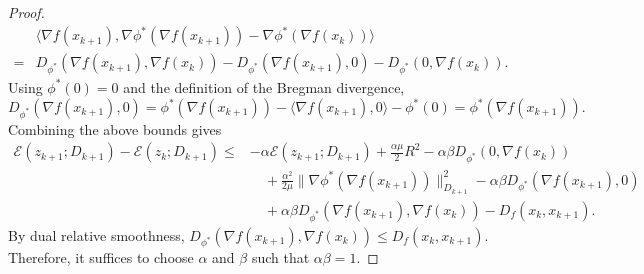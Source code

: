 \documentclass{article}
\theoremstyle{plain}
\newtheorem{lemma}{Lemma}
\theoremstyle{remark}
\begin{document}
\begin{proof}
$$\begin{aligned}
&\langle \nabla f(x_{k+1}), \nabla \phi^*(\nabla f(x_{k+1})) - \nabla \phi^*(\nabla f(x_{k}))\rangle
\\
={}& D_{\phi^*}(\nabla f(x_{k+1}),\nabla f(x_{k})) - D_{\phi^*}(\nabla f(x_{k+1}),0) - D_{\phi^*}(0,\nabla f(x_{k})).
\end{aligned}
$$
Using $\phi^*(0)=0$ and the definition of the Bregman divergence,
$$
D_{\phi^*}(\nabla f(x_{k+1}),0)=\phi^*(\nabla f(x_{k+1}))-\langle \nabla f(x_{k+1}),0\rangle-\phi^*(0)=\phi^*(\nabla f(x_{k+1})).
$$
Combining the above bounds gives
$$
\begin{aligned}
\mathcal{E}(z_{k+1};D_{k+1}) - \mathcal{E}(z_k;D_{k+1})
\leq{}& -\alpha \mathcal{E}(z_{k+1};D_{k+1}) + \frac{\alpha\mu}{2}R^2  - \alpha\beta D_{\phi^*}(0,\nabla f(x_{k}))
\\
&\quad + \frac{\alpha^2}{2\mu}\|\nabla \phi^*(\nabla f(x_{k+1}))\|_{D_{k+1}}^2 - \alpha\beta D_{\phi^*}(\nabla f(x_{k+1}),0)
\\
&\quad +\alpha\beta D_{\phi^*}(\nabla f(x_{k+1}),\nabla f(x_{k})) - D_{f}(x_{k},x_{k+1}).
\end{aligned}
$$
By dual relative smoothness, $ D_{\phi^*}(\nabla f(x_{k+1}),\nabla f(x_{k})) \leq D_f(x_{k},x_{k+1})$. Therefore, it suffices to choose $\alpha$ and $\beta$ such that $\alpha\beta=1$.
\end{proof}


\end{document}
